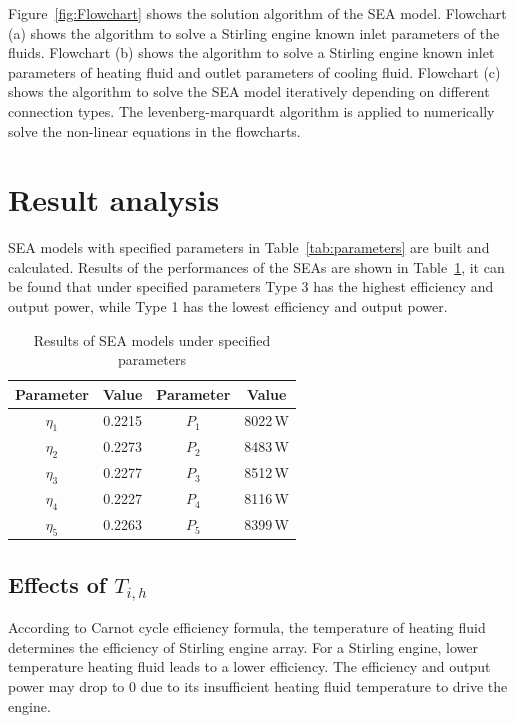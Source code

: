Figure~\ref{fig:Flowchart} shows the solution algorithm of the SEA model. Flowchart (a) shows the algorithm to solve a Stirling engine known inlet parameters of the fluids. Flowchart (b) shows the algorithm to solve a Stirling engine known inlet parameters of heating fluid and outlet parameters of cooling fluid. Flowchart (c) shows the algorithm to solve the SEA model iteratively depending on different connection types. The levenberg-marquardt algorithm is applied to numerically solve the non-linear equations in the flowcharts.

\section{Result analysis}

SEA models with specified parameters in Table~\ref{tab:parameters} are built and calculated. Results of the performances of the SEAs are shown in Table~\ref{tab:result}, it can be found that under specified parameters Type 3 has the highest efficiency and output power, while Type 1 has the lowest efficiency and output power.

\begin{table}[htbp]
	\caption{Results of SEA models under specified parameters}
	\begin{center}
	\begin{tabular}{cccc}
		\toprule
		Parameter		&	Value	&	Parameter		&	Value\\
		\midrule
		$\eta_1$	&	0.2215	&	$P_1$		&	8022\,W\\
		$\eta_2$	&	0.2273	&	$P_2$		&	8483\,W\\
		$\eta_3$	&	0.2277	&	$P_3$		&	8512\,W\\
		$\eta_4$	&	0.2227	&	$P_4$		&	8116\,W\\
		$\eta_5$	&	0.2263	&	$P_5$		&	8399\,W\\		
		\bottomrule
	\end{tabular}
	\end{center}
	\label{tab:result}
\end{table}

\subsection{Effects of $T_{i,h}$}
According to Carnot cycle efficiency formula, the temperature of heating fluid determines the efficiency of Stirling engine array. For a Stirling engine, lower temperature heating fluid leads to a lower efficiency. The efficiency and output power may drop to 0 due to its insufficient heating fluid temperature to drive the engine.


